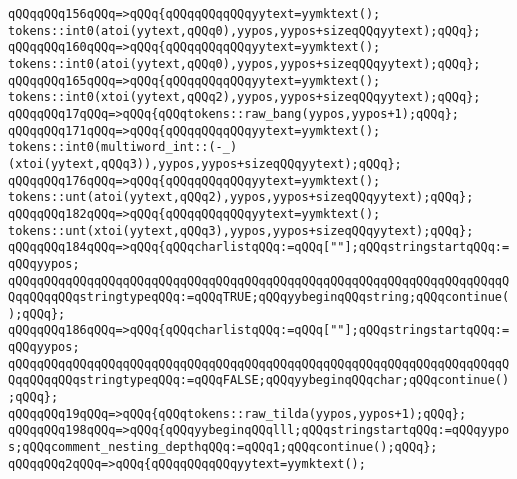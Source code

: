 \verb|qQQqqQQq156qQQq=>qQQq{qQQqqQQqqQQqyytext=yymktext();|\newline
\verb|tokens::int0(atoi(yytext,qQQq0),yypos,yypos+sizeqQQqyytext);qQQq};|\newline
\verb|qQQqqQQq160qQQq=>qQQq{qQQqqQQqqQQqyytext=yymktext();|\newline
\verb|tokens::int0(atoi(yytext,qQQq0),yypos,yypos+sizeqQQqyytext);qQQq};|\newline
\verb|qQQqqQQq165qQQq=>qQQq{qQQqqQQqqQQqyytext=yymktext();|\newline
\verb|tokens::int0(xtoi(yytext,qQQq2),yypos,yypos+sizeqQQqyytext);qQQq};|\newline
\verb|qQQqqQQq17qQQq=>qQQq{qQQqtokens::raw_bang(yypos,yypos+1);qQQq};|\newline
\verb|qQQqqQQq171qQQq=>qQQq{qQQqqQQqqQQqyytext=yymktext();|\newline
\verb|tokens::int0(multiword_int::(-_)(xtoi(yytext,qQQq3)),yypos,yypos+sizeqQQqyytext);qQQq};|\newline
\verb|qQQqqQQq176qQQq=>qQQq{qQQqqQQqqQQqyytext=yymktext();|\newline
\verb|tokens::unt(atoi(yytext,qQQq2),yypos,yypos+sizeqQQqyytext);qQQq};|\newline
\verb|qQQqqQQq182qQQq=>qQQq{qQQqqQQqqQQqyytext=yymktext();|\newline
\verb|tokens::unt(xtoi(yytext,qQQq3),yypos,yypos+sizeqQQqyytext);qQQq};|\newline
\verb|qQQqqQQq184qQQq=>qQQq{qQQqcharlistqQQq:=qQQq[""];qQQqstringstartqQQq:=qQQqyypos;|\newline
\verb|qQQqqQQqqQQqqQQqqQQqqQQqqQQqqQQqqQQqqQQqqQQqqQQqqQQqqQQqqQQqqQQqqQQqqQQqqQQqqQQqstringtypeqQQq:=qQQqTRUE;qQQqyybeginqQQqstring;qQQqcontinue();qQQq};|\newline
\verb|qQQqqQQq186qQQq=>qQQq{qQQqcharlistqQQq:=qQQq[""];qQQqstringstartqQQq:=qQQqyypos;|\newline
\verb|qQQqqQQqqQQqqQQqqQQqqQQqqQQqqQQqqQQqqQQqqQQqqQQqqQQqqQQqqQQqqQQqqQQqqQQqqQQqqQQqstringtypeqQQq:=qQQqFALSE;qQQqyybeginqQQqchar;qQQqcontinue();qQQq};|\newline
\verb|qQQqqQQq19qQQq=>qQQq{qQQqtokens::raw_tilda(yypos,yypos+1);qQQq};|\newline
\verb|qQQqqQQq198qQQq=>qQQq{qQQqyybeginqQQqlll;qQQqstringstartqQQq:=qQQqyypos;qQQqcomment_nesting_depthqQQq:=qQQq1;qQQqcontinue();qQQq};|\newline
\verb|qQQqqQQq2qQQq=>qQQq{qQQqqQQqqQQqyytext=yymktext();|\newline
